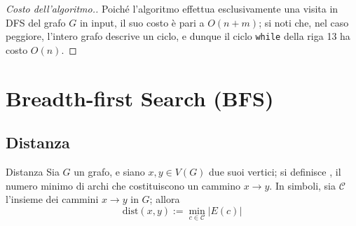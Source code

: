 \documentclass[a4paper, 12pt]{report}
\begin{document}
    \begin{proof}[Costo dell'algoritmo.]
        Poiché l'algoritmo effettua esclusivamente una visita in DFS del grafo $G$ in input, il suo costo è pari a $O(n + m)$; si noti che, nel caso peggiore, l'intero grafo descrive un ciclo, e dunque il ciclo \texttt{while} della riga 13 ha costo $O(n)$.
    \end{proof}

    \section{Breadth-first Search (BFS)}

    \subsection{Distanza}

    \begin{frameddefn}[label={distanza}]{Distanza}
        Sia $G$ un grafo, e siano $x, y \in V(G)$ due suoi vertici; si definisce , il numero minimo di archi che costituiscono un cammino $x \rightarrow y$. In simboli, sia $\mathcal{C}$ l'insieme dei cammini $x \rightarrow y$ in $G$; allora $$\mathrm{dist}(x, y) := \min_{c \in \mathcal{C}}{\left |E(c) \right|}$$
    \end{frameddefn}
\end{document}

